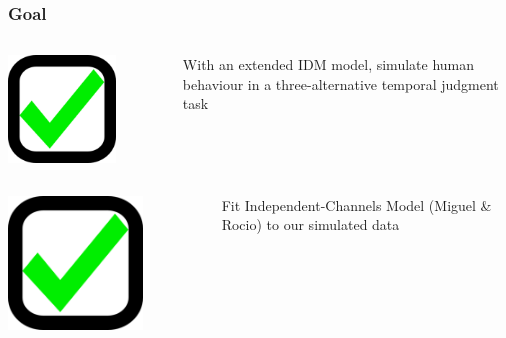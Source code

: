 \documentclass[xcolor={fixpdftex,hyperref,x11names},10pt,pdftex,hyperref={pdftex}]{beamer}
\begin{document}
\begin{frame}
  \frametitle{Goal}
  \begin{columns}
  \begin{column}{0.30\textwidth}
  \includegraphics[width=0.7\textwidth]{figs/checkbox-checked.png}
  \end{column}
  \begin{column}{0.70\textwidth}
  With an extended IDM model, simulate human behaviour in a three-alternative temporal judgment task
  \end{column}
  \end{columns}
  \begin{columns}
  \begin{column}{0.30\textwidth}
  \includegraphics[width=0.7\textwidth]{figs/checkbox-checked.png}
  \end{column}
  \begin{column}{0.70\textwidth}
  Fit Independent-Channels Model (Miguel \& Rocio) to our simulated data 
  \end{column}
  \end{columns}
\end{frame}
\end{document}
